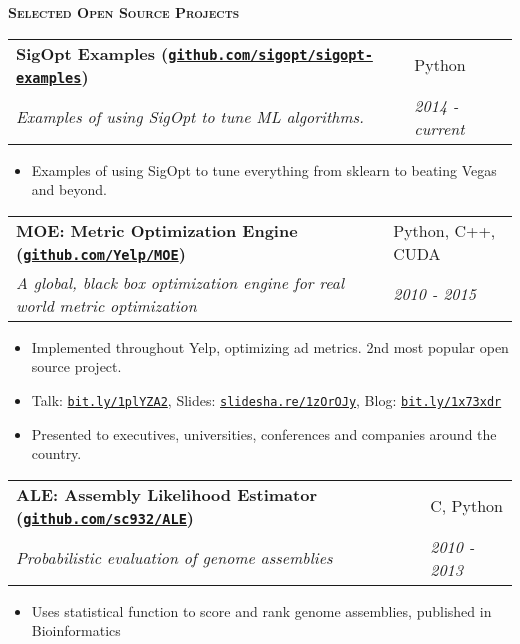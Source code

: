 \documentclass[letterpaper, 11pt]{article}
\makeatletter
\renewcommand{\section}[1]{%
  \begin{tcolorbox}
    \textsc{\textbf{\large{#1}}}
  \end{tcolorbox}
}
\newcommand{\entry}[4]{%
  \begin{tabularx}{\linewidth}{@{}Xl@{}}
    \textbf{#1} & #2          \\
    \textit{#3} & \textit{#4} \\
  \end{tabularx}
}
\newcommand{\website}[1]{\href{http://#1}{\texttt{#1}}}
\makeatother
\begin{document}
  \section{Selected Open Source Projects}
  
  \entry{SigOpt Examples (\website{github.com/sigopt/sigopt-examples})}{Python}{Examples of using SigOpt to tune ML algorithms.}{2014 - current}
  \begin{itemize}
    \item{Examples of using SigOpt to tune everything from sklearn to beating Vegas and beyond.}
  \end{itemize}

  \entry{MOE: Metric Optimization Engine (\website{github.com/Yelp/MOE})}{Python, C++, CUDA}{A global, black box optimization engine for real world metric optimization}{2010 - 2015}
  \begin{itemize}
    \item{Implemented throughout Yelp, optimizing ad metrics. 2nd most popular open source project.}
    \item{Talk: \website{bit.ly/1plYZA2}, Slides: \website{slidesha.re/1zOrOJy}, Blog: \website{bit.ly/1x73xdr}}
    \item{Presented to executives, universities, conferences and companies around the country.}
  \end{itemize}

  \entry{ALE: Assembly Likelihood Estimator (\website{github.com/sc932/ALE})}{C, Python}{Probabilistic evaluation of genome assemblies}{2010 - 2013}
  \begin{itemize}
    \item{Uses statistical function to score and rank genome assemblies, published in Bioinformatics}
  \end{itemize}
\end{document}
